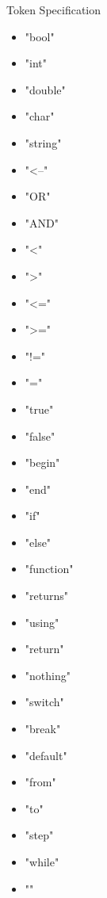 
Token Specification 

\begin{itemize}

\item "bool"
\item "int"
\item "double"
\item "char"
\item "string"
\item "<--"
\item "OR"
\item "AND"
\item "<"
\item ">"
\item "<="
\item ">="
\item "!="
\item "="
\item "true"
\item "false"
\item "begin"
\item "end"
\item "if"
\item "else"
\item "function"
\item "returns"
\item "using"
\item "return"
\item "nothing"
\item "switch"
\item "break"
\item "default"
\item "from"
\item "to"
\item "step"
\item "while"





\item ""
\end{itemize}